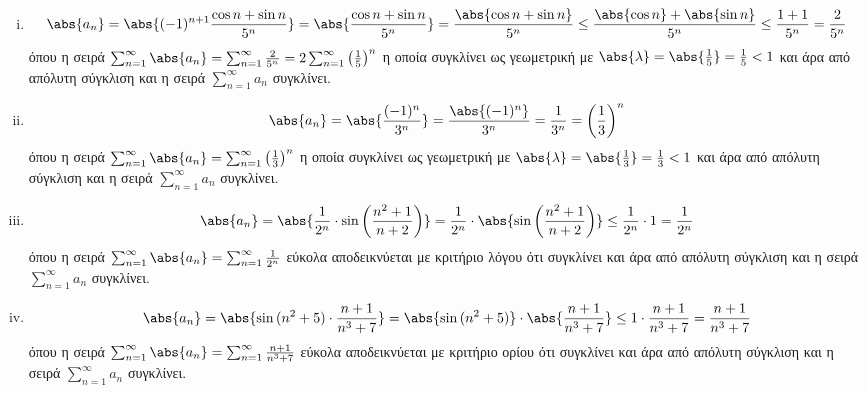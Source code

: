 \documentclass[a4paper,table]{report}
\begin{document}
\begin{enumerate}
\begin{enumerate}[i)]
      \item 
        \[
          \abs{a_{n}} = \abs{(-1)^{n+1} \frac{\cos{n} + \sin{n}}{5^{n}}} = 
          \abs{\frac{\cos{n} + \sin{n}}{5^{n}}} = 
          \frac{\abs{\cos{n} + \sin{n}}}{5^{n}}
          \leq \frac{\abs{\cos{n}} + \abs{\sin{n}}}{5^{n}} 
          \leq \frac{1+1}{5^{n}} = \frac{2}{5^{n}}  
        \] 
        όπου η σειρά $ \sum_{n=1}^{\infty} \abs{a_{n}} = \sum_{n=1}^{\infty} 
        \frac{2}{5^{n}} = 2 \sum_{n=1}^{\infty} \left(\frac{1}{5} \right)^{n} $
        η οποία συγκλίνει ως γεωμετρική με 
        $ \abs{\lambda} = \abs{\frac{1}{5}} = \frac{1}{ 5} <1 $ και άρα από 
        απόλυτη σύγκλιση και η σειρά $ \sum_{n=1}^{\infty} a_{n} $ συγκλίνει.

      \item 
        \[
          \abs{a_{n}} = \abs{\frac{(-1)^{n}}{3^{n}}} = 
          \frac{\abs{(-1)^{n}}}{3^{n}} = \frac{1}{3^{n}} = 
          \left(\frac{1}{3}\right)^{n} 
        \] 
        όπου η σειρά $ \sum_{n=1}^{\infty} \abs{a_{n}} = \sum_{n=1}^{\infty} 
        \left(\frac{1}{3}\right)^{n} $
        η οποία συγκλίνει ως γεωμετρική με 
        $ \abs{\lambda} = \abs{\frac{1}{3}} = \frac{1}{3}<1 $ και άρα από 
        απόλυτη σύγκλιση και η σειρά $ \sum_{n=1}^{\infty} a_{n} $ συγκλίνει.

      \item 
        \[
          \abs{a_{n}} = \abs{\frac{1}{2^{n}} \cdot 
          \sin{\left(\frac{n^{2}+1}{n+2}\right)}} =
          \frac{1}{2^{n}} \cdot \abs{\sin{\left(\frac{n^{2}+1}{n+2}\right)}} 
          \leq \frac{1}{2^{n}} \cdot 1 = \frac{1}{2^{n}}
        \] 
        όπου η σειρά $ \sum_{n=1}^{\infty} \abs{a_{n}} = 
        \sum_{n=1}^{\infty} \frac{1}{2^{n}}  $ εύκολα αποδεικνύεται με 
        κριτήριο λόγου ότι συγκλίνει και άρα από απόλυτη σύγκλιση και η σειρά
        $ \sum_{n=1}^{\infty} a_{n} $ συγκλίνει.

      \item 
        \[
          \abs{a_{n}} = \abs{\sin{(n^{2}+5)} \cdot \frac{n+1}{n^{3}+7}} = 
          \abs{\sin{(n^{2}+5)}} \cdot \abs{\frac{n+1}{n^{3}+7}} \leq 1 \cdot
          \frac{n+1}{n^{3}+7} = \frac{n+1}{n^{3}+7} 
         \] 
        όπου η σειρά $ \sum_{n=1}^{\infty} \abs{a_{n}} = 
        \sum_{n=1}^{\infty} \frac{n+1}{n^{3}+7}  $ εύκολα αποδεικνύεται με 
        κριτήριο ορίου ότι συγκλίνει και άρα από απόλυτη σύγκλιση και η σειρά
        $ \sum_{n=1}^{\infty} a_{n} $ συγκλίνει.


\end{enumerate}
\end{enumerate}
\end{document}
